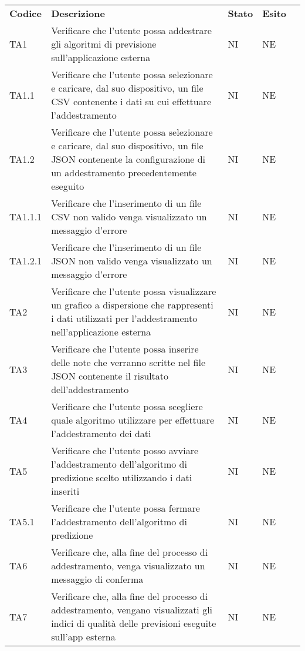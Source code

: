 \setcounter{table}{0}
\begin{longtable} {
		>{}p{15mm} 
		>{}p{79.5mm}
		>{}p{15mm} 
		>{}p{15mm}
		>{}p{0mm}}
	\rowcolor{gray!50}
	\textbf{Codice} & \textbf{Descrizione} & \textbf{Stato} & \textbf{Esito} &\TBstrut \\
	TA1 & Verificare che l'utente possa addestrare gli algoritmi di previsione sull'applicazione esterna & NI & NE &\TBstrut \\ [2mm]
	TA1.1 & Verificare che l'utente possa selezionare e caricare, dal suo dispositivo, un file CSV contenente i dati su cui effettuare l'addestramento & NI & NE &\TBstrut \\ [2mm]
	TA1.2 & Verificare che l'utente possa selezionare e caricare, dal suo dispositivo, un file JSON contenente la configurazione di un addestramento precedentemente eseguito & NI & NE &\TBstrut \\ [2mm]
	TA1.1.1 & Verificare che l'inserimento di un file CSV non valido venga visualizzato un messaggio d'errore & NI & NE &\TBstrut \\ [2mm]
	TA1.2.1 & Verificare che l'inserimento di un file JSON non valido venga visualizzato un messaggio d'errore & NI & NE &\TBstrut \\ [2mm]
	TA2 & Verificare che l'utente possa visualizzare un grafico a dispersione che rappresenti i dati utilizzati per l'addestramento nell'applicazione esterna & NI & NE &\TBstrut \\ [2mm] 
	TA3 & Verificare che l'utente possa inserire delle note che verranno scritte nel file JSON contenente il risultato dell'addestramento & NI & NE&\TBstrut \\ [2mm]
	TA4 & Verificare che l'utente possa scegliere quale algoritmo utilizzare per effettuare l'addestramento dei dati & NI & NE &\TBstrut \\ [2mm] 
	TA5 & Verificare che l'utente posso avviare l'addestramento dell'algoritmo di predizione scelto utilizzando i dati inseriti & NI & NE &\TBstrut \\ [2mm]
	TA5.1 & Verificare che l'utente possa fermare l'addestramento dell'algoritmo di predizione & NI & NE &\TBstrut \\ [2mm]
	TA6 & Verificare che, alla fine del processo di addestramento, venga visualizzato un messaggio di conferma & NI & NE &\TBstrut \\ [2mm]
	TA7 & Verificare che, alla fine del processo di addestramento, vengano visualizzati gli indici di qualità delle previsioni eseguite sull'app esterna & NI & NE &\TBstrut \\ [2mm]

\end{longtable}
